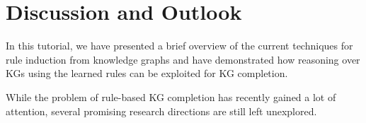 \section{Discussion and Outlook}\label{sec:disc}

In this tutorial, we have presented a brief overview of the current techniques for rule induction from knowledge graphs and have demonstrated how reasoning over KGs using the learned rules  can be exploited for KG completion. %

While the problem of rule-based KG completion has recently gained a lot of attention, several promising research directions are still left unexplored. %

